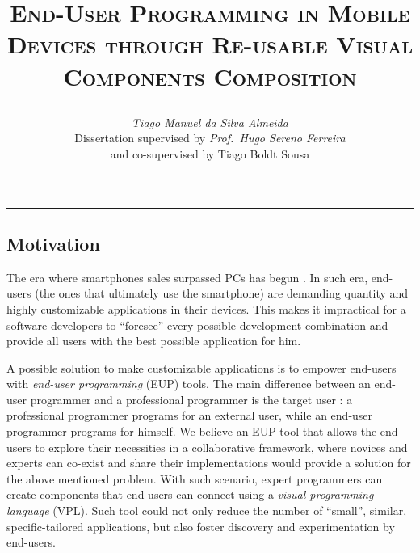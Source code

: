\documentclass[9pt,a4paper]{extarticle}
\begin{document}
\title{\vspace*{-8mm}\textbf{\textsc{End-User Programming in Mobile Devices
through Re-usable Visual Components Composition}}
\author{\emph{Tiago Manuel da Silva Almeida}\\[2mm]
\small{Dissertation supervised by \emph{Prof.\ Hugo Sereno Ferreira}}\\
\small{and co-supervised by Tiago Boldt Sousa}}}
\date{}
\maketitle
\thispagestyle{empty}

\vspace*{-4mm}\noindent\rule{\textwidth}{0.4pt}\vspace*{4mm}

\begin{multicols}{2}

\section{Motivation}\label{sec:motiva}

The era where smartphones sales surpassed PCs has begun \cite{more_smartphones}. In such era, end-users (the ones that ultimately use the smartphone) 
are demanding quantity and highly customizable applications in their devices. 
This makes it impractical for a software developers to ``foresee'' every possible development combination and provide all users with the best possible application for him. 

A possible solution to make customizable applications is to empower end-users with \emph{end-user programming} (EUP) tools. 
The main difference between an end-user programmer and a professional programmer is the target user \cite{SotaEUE2011}: a professional programmer programs for an external user, while an end-user programmer programs for himself.
We believe an EUP tool that allows the end-users to explore their necessities in a collaborative framework, where novices and experts can co-exist and share their implementations would provide a solution for the above mentioned problem. With such scenario, expert programmers can create components that end-users can connect using a \emph{visual programming language} (VPL). Such tool could not only reduce the number of ``small'', similar, specific-tailored applications, but also foster discovery and experimentation by end-users.


\end{multicols}
\end{document}
